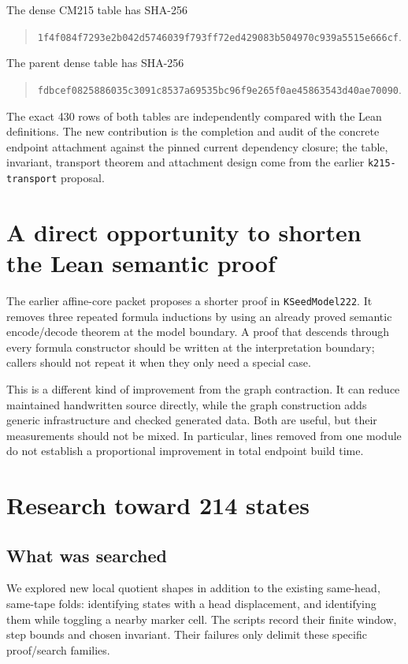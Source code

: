 \documentclass[11pt,letterpaper]{article}
\theoremstyle{definition}\newtheorem{definition}[theorem]{Definition}
\begin{document}
The dense CM215 table has SHA-256
\begin{quote}\ttfamily\small
\nolinkurl{1f4f084f7293e2b042d5746039f793ff72ed429083b504970c939a5515e666cf}.
\end{quote}
The parent dense table has SHA-256
\begin{quote}\ttfamily\small
\nolinkurl{fdbcef0825886035c3091c8537a69535bc96f9e265f0ae45863543d40ae70090}.
\end{quote}
The exact 430 rows of both tables are independently compared with the Lean
definitions. The new contribution is the completion and audit of the concrete
endpoint attachment against the pinned current dependency closure; the table,
invariant, transport theorem and attachment design come from the earlier
\texttt{k215-transport} proposal.

\section{A direct opportunity to shorten the Lean semantic proof}

The earlier affine-core packet proposes a shorter proof in
\texttt{KSeedModel222}. It removes three repeated formula inductions by using an
already proved semantic encode/decode theorem at the model boundary. A proof that descends
through every formula constructor should be written at the interpretation
boundary; callers should not repeat it when they only need a special case.



This is a different kind of improvement from the graph contraction. It can
reduce maintained handwritten source directly, while the graph construction
adds generic infrastructure and checked generated data. Both are useful, but
their measurements should not be mixed. In particular, lines removed from one
module do not establish a proportional improvement in total endpoint build
time.

\section{Research toward 214 states}\label{sec:214}

\subsection{What was searched}

We explored new local quotient shapes in addition to the existing same-head,
same-tape folds: identifying states with a head displacement, and identifying
them while toggling a nearby marker cell. The scripts record their finite
window, step bounds and chosen invariant. Their failures only delimit these
specific proof/search families.
\end{document}
